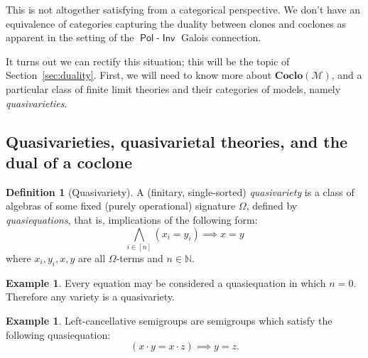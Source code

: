 \documentclass[11pt, a4paper, twoside,leqno]{amsart}
\newcommand{\cat}[1]{\mathbf{#1}}
\numberwithin{equation}{section}
\theoremstyle{plain}
\theoremstyle{definition}
\newtheorem{Defn}[Thm]{Definition}
\newtheorem{Ex}[Thm]{Example}
\DeclareMathOperator{\Pol}{\mathsf{Pol}}
\DeclareMathOperator{\Inv}{\mathsf{Inv}}
\begin{document}
This is not altogether satisfying from a categorical perspective. We
don't have an equivalence of categories capturing the duality between
clones and coclones as apparent in the setting of the
\(\Pol\)-\(\Inv\) Galois connection.

It turns out we can rectify this situation; this
will be the topic of Section~\ref{sec:duality}. First, we will need to know more
about \(\cat{Coclo}(\mathcal{M}
)\), and a particular class of finite limit theories and their
categories of models, namely \emph{quasivarieties}. 


\subsection{Quasivarieties, quasivarietal theories, and the dual of a coclone}
\label{sec:quasivariety}

\begin{Defn}[Quasivariety]
  \label{def:quasivariety}
  A (finitary, single-sorted) \emph{quasivariety} is a class of
  algebras of some fixed (purely operational) signature \(\Omega\), defined by
  \emph{quasiequations}, that is, implications of the following form:
  \begin{equation}
    \label{eq:21}
    \bigwedge_{i\in [n]} (x_{i} = y_{i}) \implies x = y
  \end{equation}
  where \(x_{i},y_{i},x,y\) are all \(\Omega\)-terms and \(n\in \mathbb{N}
  \).
\end{Defn}

\begin{Ex}
  \label{ex:variety-is-qv}
  Every equation may be considered a quasiequation in which \(n
  = 0\). Therefore any variety is a quasivariety.
\end{Ex}

\begin{Ex}
  \label{ex:left-semigrp}
  Left-cancellative semigroups are semigroups which satisfy the following
  quasiequation:
  \begin{equation*}
    \label{eq:22}
    (x \cdot y = x \cdot z) \implies y = z.
  \end{equation*}
\end{Ex}
\end{document}
